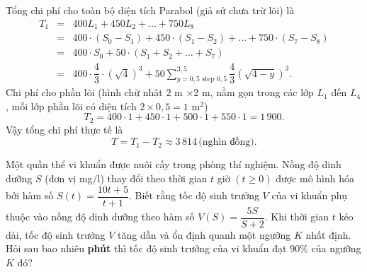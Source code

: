 \begin{ex}
{		Tổng chi phí cho toàn bộ diện tích Parabol (giả sử chưa trừ lõi) là
		\begin{eqnarray*}
			T_1	&=& 400 L_1+450 L_2+\ldots+750 L_8 \\
			&=&400\cdot\left(S_0-S_1\right)+450\cdot\left(S_1-S_2\right)+\ldots+750\cdot\left(S_7-S_8\right)\\
			&=&400\cdot S_0+50\cdot\left(S_1+S_2+\ldots+S_7\right) \\
			&=&400 \cdot \dfrac{4}{3} \cdot\left(\sqrt{4}\right)^3+50 \displaystyle\sum\limits_{y=0{,}5 \text { step } 0{,}5}^{3{,}5} \dfrac{4}{3}\left(\sqrt{4-y}\right)^3.
		\end{eqnarray*}
		Chi phí cho phần lõi (hình chữ nhât $2$ m $\times 2$ m, nằm gọn trong các lớp $L_1$ đến $L_4$, mỗi lớp phần lõi có diện tích $2 \times 0{,}5=1$ m$^2$)
		$$T_2=400 \cdot 1+450 \cdot 1+500 \cdot 1+550 \cdot 1=1\,900.$$
		Vậy tổng chi phí thực tế là
		$$T=T_1-T_2 \approx 3\,814\, \text {(nghìn đồng)}.$$	
	}
\end{ex}


\begin{ex}%
	Một quần thể vi khuẩn được nuôi cấy trong phòng thí nghiệm. Nồng độ dinh dưỡng $S$ (đơn vị mg/l) thay đổi theo thời gian $t$ giờ $(t \geq 0)$ được mô hình hóa bởi hàm số $S(t)=\dfrac{10 t+5}{t+1}$. Biết rằng tốc độ sinh trưởng $V$ của vi khuẩn phụ thuộc vào nồng độ dinh dưỡng theo hàm số $V(S)=\dfrac{5 S}{S+2}$. Khi thời gian $t$ kéo dài, tốc độ sinh trưởng $V$ tăng dần và ổn định quanh một ngưỡng $K$ nhất định. Hỏi sau bao nhiêu \textbf{phút} thì tốc độ sinh trưởng của vi khuẩn đạt $90\%$ của ngưỡng $K$ đó?
\end{ex}

